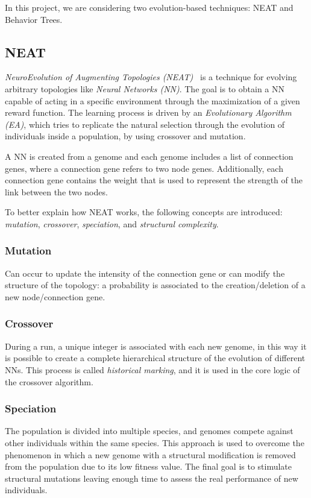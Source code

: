 In this project, we are considering two evolution-based techniques: NEAT and Behavior Trees.

\subsection{NEAT}
\textit{NeuroEvolution of Augmenting Topologies (NEAT)}~\cite{NEAT} is a technique for evolving arbitrary topologies like \textit{Neural Networks (NN)}. The goal is to obtain a NN capable of acting in a specific environment through the maximization of a given reward function. The learning process is driven by an \textit{Evolutionary Algorithm (EA)}, which tries to replicate the natural selection through the evolution of individuals inside a population, by using crossover and mutation.

A NN is created from a genome and each genome includes a list of connection genes, where a connection gene refers to two node genes. Additionally, each connection gene contains the weight that is used to represent the strength of the link between the two nodes.

To better explain how NEAT works, the following concepts are introduced: \emph{mutation}, \emph{crossover}, \emph{speciation}, and \emph{structural complexity}.

\subsubsection{Mutation}
Can occur to update the intensity of the connection gene or can modify the structure of the topology: a probability is associated to the creation/deletion of a new node/connection gene.

\subsubsection{Crossover}
During a run, a unique integer is associated with each new genome, in this way it is possible to create a complete hierarchical structure of the evolution of different NNs. This process is called \emph{historical marking}, and it is used in the core logic of the crossover algorithm.

\subsubsection{Speciation}
The population is divided into multiple species, and genomes compete against other individuals within the same species. This approach is used to overcome the phenomenon in which a new genome with a structural modification is removed from the population due to its low fitness value. The final goal is to stimulate structural mutations leaving enough time to assess the real performance of new individuals.

